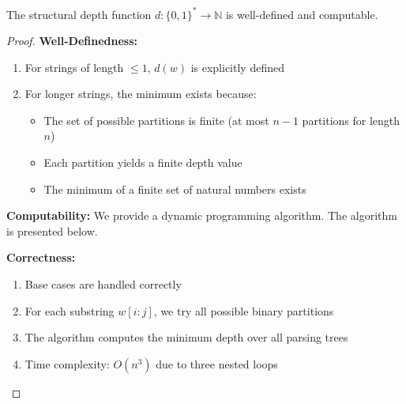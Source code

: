 \begin{lemma}
The structural depth function $d: \{0,1\}^* \to \mathbb{N}$ is well-defined and computable.
\end{lemma}

\begin{proof}
\textbf{Well-Definedness:}
\begin{enumerate}
\item For strings of length $\leq 1$, $d(w)$ is explicitly defined
\item For longer strings, the minimum exists because:
  \begin{itemize}
  \item The set of possible partitions is finite (at most $n-1$ partitions for length $n$)
  \item Each partition yields a finite depth value
  \item The minimum of a finite set of natural numbers exists
  \end{itemize}
\end{enumerate}

\textbf{Computability:}
We provide a dynamic programming algorithm. The algorithm is presented below.

\textbf{Correctness:}
\begin{enumerate}
\item Base cases are handled correctly
\item For each substring $w[i:j]$, we try all possible binary partitions
\item The algorithm computes the minimum depth over all parsing trees
\item Time complexity: $O(n^3)$ due to three nested loops
\end{enumerate}
\end{proof}

